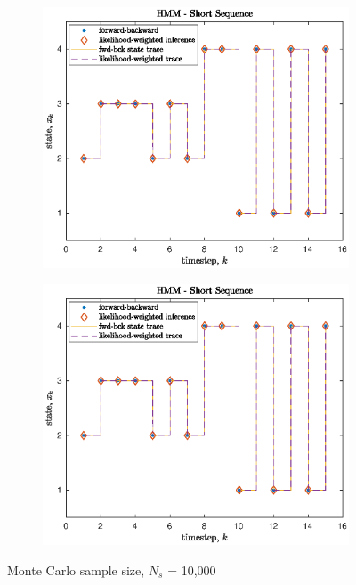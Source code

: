 \documentclass[]{article}
\begin{document}
\begin{figure}[H]
	\begin{subfigure}[b]{0.45\textwidth}
		\begin{center}  
			\includegraphics[scale=0.55]{p2_state_trace_10000_1.eps}  
			\caption{}
			\label{}
		\end{center}
	\end{subfigure}
	\hfill
	\begin{subfigure}[b]{0.45\textwidth}
		\begin{center}  
			\includegraphics[scale=0.55]{p2_state_trace_10000_1.eps}  
			\caption{}
			\label{}
		\end{center}
	\end{subfigure}
	\caption{Monte Carlo sample size, $N_s$ = 10,000}
\end{figure}
\end{document}
